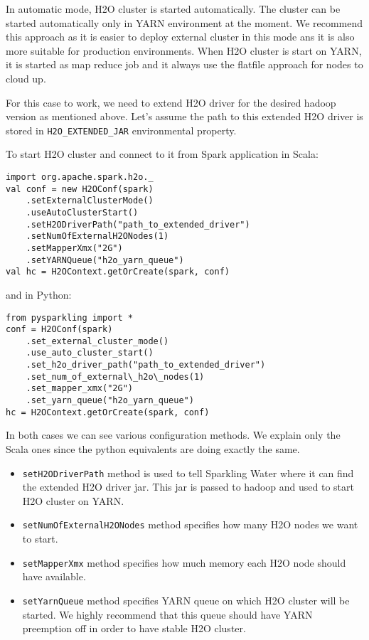 In automatic mode, H2O cluster is started automatically. The cluster can be started automatically only in YARN environment at the moment. We recommend this approach as it is easier to deploy external cluster in this mode ans it is also more suitable for production environments. When H2O cluster is start on YARN, it is started as map reduce job and it always use the flatfile approach for nodes to cloud up.

For this case to work, we need to extend H2O driver for the desired hadoop version as mentioned above. Let's assume the path to this extended H2O driver is stored in \texttt{H2O\_EXTENDED\_JAR} environmental property.

To start H2O cluster and connect to it from Spark application in Scala:
\begin{lstlisting}[style=Scala]
import org.apache.spark.h2o._
val conf = new H2OConf(spark)
    .setExternalClusterMode()
    .useAutoClusterStart()
    .setH2ODriverPath("path_to_extended_driver")
    .setNumOfExternalH2ONodes(1)
    .setMapperXmx("2G")
    .setYARNQueue("h2o_yarn_queue")
val hc = H2OContext.getOrCreate(spark, conf)
\end{lstlisting}


and in Python:
\begin{lstlisting}[style=Python]
from pysparkling import *
conf = H2OConf(spark)
    .set_external_cluster_mode()
    .use_auto_cluster_start()
    .set_h2o_driver_path("path_to_extended_driver")
    .set_num_of_external\_h2o\_nodes(1)
    .set_mapper_xmx("2G")
    .set_yarn_queue("h2o_yarn_queue")
hc = H2OContext.getOrCreate(spark, conf)
\end{lstlisting}


In both cases we can see various configuration methods. We explain only the Scala ones since the python equivalents are doing exactly the same.

\begin{itemize}
    \item \texttt{setH2ODriverPath} method is used to tell Sparkling Water where it can find the extended H2O driver jar. This jar is passed to hadoop and used to start H2O cluster on YARN.
    \item \texttt{setNumOfExternalH2ONodes} method specifies how many H2O nodes we want to start.
    \item \texttt{setMapperXmx} method specifies how much memory each H2O node should have available.
    \item \texttt{setYarnQueue} method specifies YARN queue on which H2O cluster will be started. We highly recommend that this queue should have YARN preemption off in order to have stable H2O cluster.
\end{itemize}

